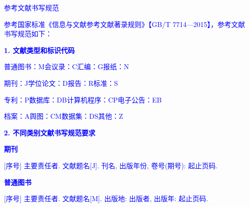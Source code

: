 
\begin{bibprint}



\BiblatexSplitbibDefernumbersWarningOff

\textcolor{blue}{参考文献书写规范}

\textcolor{blue}{参考国家标准《信息与文献参考文献著录规则》【GB/T 7714—2015】，参考文献书写规范如下：}

\textcolor{blue}{\textbf{1. 文献类型和标识代码}}

\textcolor{blue}{普通图书：M}\qquad\textcolor{blue}{会议录：C}\qquad\textcolor{blue}{汇编：G}\qquad\textcolor{blue}{报纸：N}

\textcolor{blue}{期刊：J}\qquad\textcolor{blue}{学位论文：D}\qquad\textcolor{blue}{报告：R}\qquad\textcolor{blue}{标准：S}

\textcolor{blue}{专利：P}\qquad\textcolor{blue}{数据库：DB}\qquad\textcolor{blue}{计算机程序：CP}\qquad\textcolor{blue}{电子公告：EB}

\textcolor{blue}{档案：A}\qquad\textcolor{blue}{舆图：CM}\qquad\textcolor{blue}{数据集：DS}\qquad\textcolor{blue}{其他：Z}

\textcolor{blue}{\textbf{2. 不同类别文献书写规范要求}}

\textcolor{blue}{\textbf{期刊}}

\noindent\textcolor{blue}{[序号] 主要责任者. 文献题名[J]. 刊名, 出版年份, 卷号(期号): 起止页码. }
\cite{yuFeiJiZongTiDuoXueKeSheJiYouHuaDeXianZhuangYuFaZhanFangXiang2008, Hajela2012Application}

\printbibliography [type=article,heading=none]

\textcolor{blue}{\textbf{普通图书}}

\noindent\textcolor{blue}{[序号] 主要责任者. 文献题名[M]. 出版地: 出版者, 出版年: 起止页码. }
\cite{张伯伟2002全唐五代诗格会考, OBRIEN1994Aircraft}

\printbibliography [keyword={book},heading=none]


\end{bibprint}

